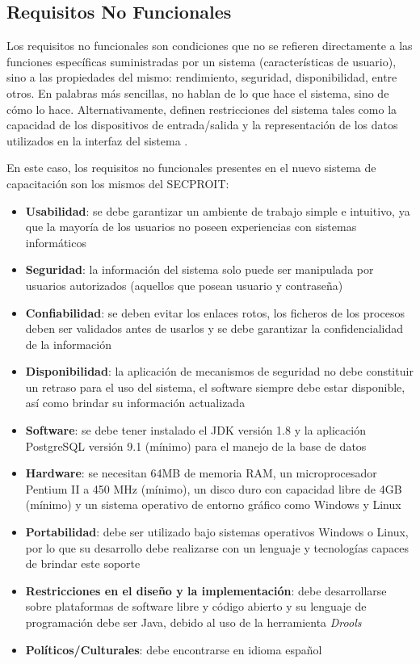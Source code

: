 \subsection{Requisitos No Funcionales}
Los requisitos no funcionales son condiciones que no se refieren directamente a las funciones específicas suministradas por un sistema (características de usuario), sino a las propiedades del mismo: rendimiento, seguridad, disponibilidad, entre otros. En palabras más sencillas, no hablan de lo que hace el sistema, sino de cómo lo hace. Alternativamente, definen restricciones del sistema tales como la capacidad de los dispositivos de entrada/salida y la representación de los datos utilizados en la interfaz del sistema \cite{Dave2022}.

En este caso, los requisitos no funcionales presentes en el nuevo sistema de capacitación son los mismos del SECPROIT:

\begin{itemize}
\item \textbf{Usabilidad}: se debe garantizar un ambiente de trabajo simple e intuitivo, ya que la mayoría de los usuarios no poseen experiencias con sistemas informáticos
\item \textbf{Seguridad}: la información del sistema solo puede ser manipulada por usuarios autorizados (aquellos que posean usuario y contraseña)
\item \textbf{Confiabilidad}: se deben evitar los enlaces rotos, los ficheros de los procesos deben ser validados antes de usarlos y se debe garantizar la confidencialidad de la información
\item \textbf{Disponibilidad}: la aplicación de mecanismos de seguridad no debe constituir un retraso para el uso del sistema, el software siempre debe estar disponible, así como brindar su información actualizada
\item \textbf{Software}: se debe tener instalado el JDK versión 1.8 y la aplicación PostgreSQL versión 9.1 (mínimo) para el manejo de la base de datos
\item \textbf{Hardware}: se necesitan 64MB de memoria RAM, un microprocesador Pentium II a 450 MHz (mínimo), un disco duro con capacidad libre de 4GB (mínimo) y un sistema operativo de entorno gráfico como Windows y Linux
\item \textbf{Portabilidad}: debe ser utilizado bajo sistemas operativos Windows o Linux, por lo que su desarrollo debe realizarse con un lenguaje y tecnologías capaces de brindar este soporte
\item \textbf{Restricciones en el diseño y la implementación}: debe desarrollarse sobre plataformas de software libre y código abierto y su lenguaje de programación debe ser Java, debido al uso de la herramienta \textsl{Drools}
\item \textbf{Políticos/Culturales}: debe encontrarse en idioma español
\end{itemize}

